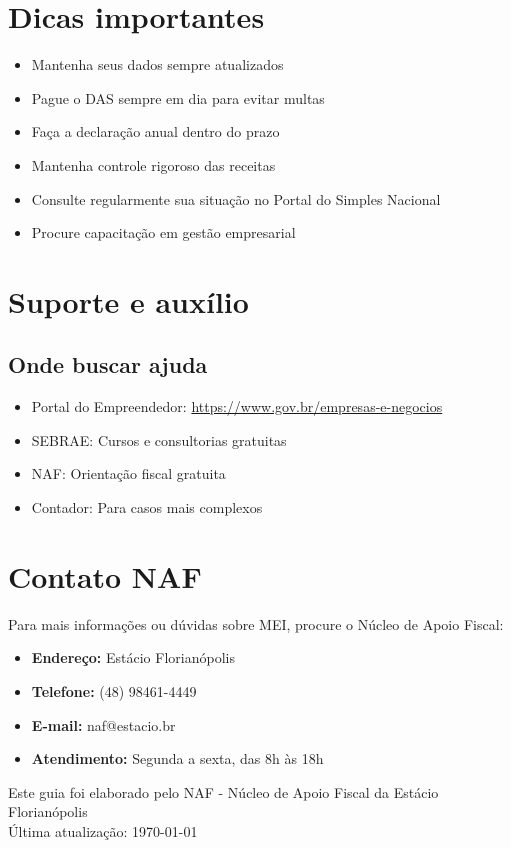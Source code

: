 \documentclass[12pt,a4paper]{article}
\begin{document}
\section{Dicas importantes}

\begin{itemize}
    \item Mantenha seus dados sempre atualizados
    \item Pague o DAS sempre em dia para evitar multas
    \item Faça a declaração anual dentro do prazo
    \item Mantenha controle rigoroso das receitas
    \item Consulte regularmente sua situação no Portal do Simples Nacional
    \item Procure capacitação em gestão empresarial
\end{itemize}

\section{Suporte e auxílio}

\subsection{Onde buscar ajuda}
\begin{itemize}
    \item Portal do Empreendedor: \url{https://www.gov.br/empresas-e-negocios}
    \item SEBRAE: Cursos e consultorias gratuitas
    \item NAF: Orientação fiscal gratuita
    \item Contador: Para casos mais complexos
\end{itemize}

\section{Contato NAF}

Para mais informações ou dúvidas sobre MEI, procure o Núcleo de Apoio Fiscal:

\begin{itemize}
    \item \textbf{Endereço:} Estácio Florianópolis
    \item \textbf{Telefone:} (48) 98461-4449
    \item \textbf{E-mail:} naf@estacio.br
    \item \textbf{Atendimento:} Segunda a sexta, das 8h às 18h
\end{itemize}

\vfill
\begin{center}
\footnotesize
Este guia foi elaborado pelo NAF - Núcleo de Apoio Fiscal da Estácio Florianópolis\\
Última atualização: \today
\end{center}
\end{document}
